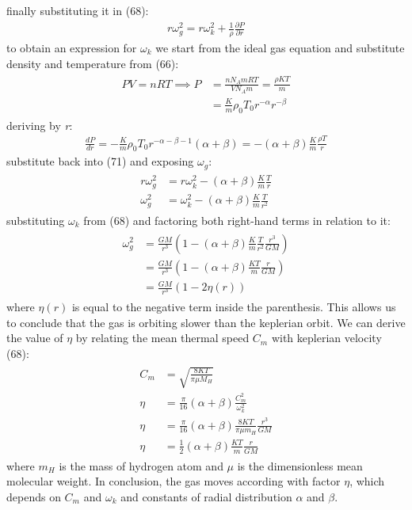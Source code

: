 \documentclass[12pt,a4paper]{article}
\begin{document}
finally substituting it in (68):
\begin{align}
    r\omega^2_g=r\omega^2_k+\frac{1}{\rho}\frac{\partial P}{\partial r}
\end{align}
to obtain an expression for $\omega_k$ we start from the ideal gas equation and substitute density and temperature from (66):
\begin{align}
\begin{split}
    PV=nRT \implies P&=\frac{nN_AmRT}{VN_Am}=\frac{\rho KT}{m} \\
    &=\frac{K}{m}\rho_0T_0r^{-\alpha}r^{-\beta}
    \end{split}
\end{align}
deriving by \textit{r}:
\begin{align}
    \frac{dP}{dr}=-\frac{K}{m}\rho_0T_0r^{-\alpha-\beta-1}(\alpha+\beta)=-(\alpha+\beta)\frac{K}{m}\frac{\rho T}{r}
\end{align}
substitute back into (71) and exposing $\omega_g$:
\begin{align}
\begin{split}
r\omega^2_g&=r\omega^2_k-(\alpha+\beta)\frac{K}{m}\frac{T}{r} \\
\omega^2_g&=\omega^2_k-(\alpha+\beta)\frac{K}{m}\frac{T}{r^2}
\end{split}
\end{align}
substituting $\omega_k$ from (68) and factoring both right-hand terms in relation to it:
\begin{align}
    \begin{split}
        \omega^2_g&=\frac{GM}{r^3}(1-(\alpha+\beta)\frac{K}{m}\frac{T}{r^2}\frac{r^3}{GM}) \\
        &=\frac{GM}{r^3}(1-(\alpha+\beta)\frac{KT}{m}\frac{r}{GM}) \\
        &=\frac{GM}{r^3}(1-2\eta(r))
    \end{split}
\end{align}
where $\eta (r)$ is equal to the negative term inside the parenthesis. This allows us to conclude that the gas is orbiting slower than the keplerian orbit. We can derive the value of $\eta$ by relating the mean thermal speed $C_m$ with keplerian velocity (68):
\begin{align}
\begin{split}
    C_m&=\sqrt{\frac{8KT}{\pi \mu M_H}} \\
    \eta&=\frac{\pi}{16}(\alpha+\beta)\frac{C_m^2}{\omega_k^2} \\
    \eta&=\frac{\pi}{16}(\alpha+\beta)\frac{8KT}{\pi\mu m_H}\frac{r^3}{GM} \\
    \eta&=\frac{1}{2}(\alpha+\beta)\frac{KT}{m}\frac{r}{GM}
\end{split}
\end{align}
where $m_H$ is the mass of hydrogen atom and $\mu$ is the dimensionless mean molecular weight. In conclusion, the gas moves according with factor $\eta$, which depends on $C_m$ and $\omega_k$ and constants of radial distribution $\alpha$ and $\beta$.
\end{document}

